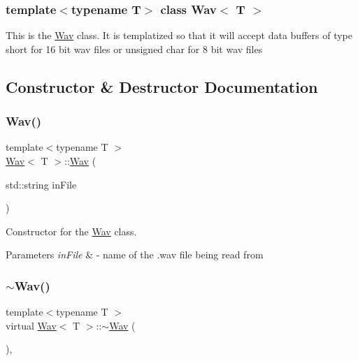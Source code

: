 \subsubsection*{template$<$typename T$>$\newline
class Wav$<$ T $>$}

This is the \hyperlink{classWav}{Wav} class. It is templatized so that it will accept data buffers of type short for 16 bit wav files or unsigned char for 8 bit wav files 

\subsection{Constructor \& Destructor Documentation}
\mbox{\label{classWav_ab265f0e3e012960f531ed5ff242c4e52}} 
\subsubsection{\texorpdfstring{Wav()}{Wav()}}
{\footnotesize\ttfamily template$<$typename T $>$ \\
\hyperlink{classWav}{Wav}$<$ T $>$\+::\hyperlink{classWav}{Wav} (\begin{DoxyParamCaption}\item[{std\+::string}]{in\+File }\end{DoxyParamCaption})}



Constructor for the \hyperlink{classWav}{Wav} class. 


\begin{DoxyParams}{Parameters}
{\em in\+File} & -\/ name of the .wav file being read from \\
\hline
\end{DoxyParams}
\mbox{\label{classWav_a54ee39542f46929187c7a9e032250bdf}} 
\subsubsection{\texorpdfstring{$\sim$\+Wav()}{~Wav()}}
{\footnotesize\ttfamily template$<$typename T $>$ \\
virtual \hyperlink{classWav}{Wav}$<$ T $>$\+::$\sim$\hyperlink{classWav}{Wav} (\begin{DoxyParamCaption}{ }\end{DoxyParamCaption})\hspace{0.3cm}{\ttfamily [inline]}, {\ttfamily [virtual]}}

